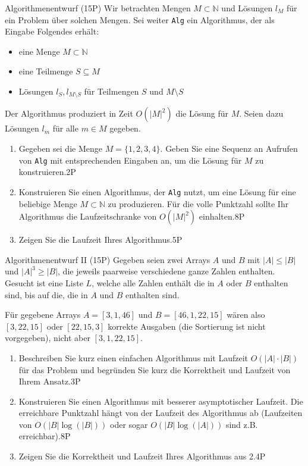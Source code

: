 \documentclass{article}
\begin{document}
\begin{exercise}{Algorithmenentwurf (15P)}
  Wir betrachten Mengen $M \subset \mathbb{N}$ und Lösungen $l_M$ für ein Problem über solchen Mengen. Sei weiter \texttt{Alg} ein Algorithmus, der als Eingabe Folgendes erhält:
  \begin{itemize}
    \item eine Menge $M \subset \mathbb{N}$
    \item eine Teilmenge $S \subseteq M$
    \item Lösungen $l_S, l_{M \setminus S}$ für Teilmengen $S$ und $M \setminus S$
  \end{itemize}
  Der Algorithmus produziert in Zeit $O(|M|^2)$ die Lösung für $M$. Seien dazu Lösungen $l_m$ für alle $m \in M$ gegeben.
  \begin{enumerate}
    \item Gegeben sei die Menge $M = \{1, 2, 3, 4\}$. Geben Sie eine Sequenz an Aufrufen von \texttt{Alg} mit entsprechenden Eingaben an, um die Lösung für $M$ zu konstruieren.\hfill 2P
    \item Konstruieren Sie einen Algorithmus, der \texttt{Alg} nutzt, um eine Lösung für eine beliebige Menge $M \subset \mathbb{N}$ zu produzieren. Für die volle Punktzahl sollte Ihr Algorithmus die Laufzeitschranke von $O(|M|^2)$ einhalten.\hfill 8P
    \item Zeigen Sie die Laufzeit Ihres Algorithmus.\hfill 5P
  \end{enumerate}
  \begin{solution}
  \end{solution}
\end{exercise}

\begin{exercise}{Algorithmenentwurf II (15P)}
  Gegeben seien zwei Arrays $A$ und $B$ mit $|A| \leq |B|$ und $|A|^3 \geq |B|$, die jeweils paarweise verschiedene ganze Zahlen enthalten. Gesucht ist eine Liste $L$, welche alle Zahlen enthält die in $A$ oder $B$ enthalten sind, bis auf die, die in $A$ und $B$ enthalten sind.\par
  Für gegebene Arrays $A = [3,1,46]$ und $B = [46,1,22,15]$ wären also $[3,22,15]$ oder $[22, 15, 3]$ korrekte Ausgaben (die Sortierung ist nicht vorgegeben), nicht aber $[3, 1, 22, 15]$.
  \begin{enumerate}
    \item Beschreiben Sie kurz einen einfachen Algorithmus mit Laufzeit $O(|A| \cdot |B|)$ für das Problem und begründen Sie kurz die Korrektheit und Laufzeit von Ihrem Ansatz.\hfill 3P
    \item Konstruieren Sie einen Algorithmus mit besserer asymptotischer Laufzeit. Die erreichbare Punktzahl hängt von der Laufzeit des Algorithmus ab (Laufzeiten von $O(|B| \log(|B|))$ oder sogar $O(|B| \log(|A|))$ sind z.B. erreichbar).\hfill 8P
    \item Zeigen Sie die Korrektheit und Laufzeit Ihres Algorithmus aus 2.\hfill 4P
  \end{enumerate}
  \begin{solution}
  \end{solution}
\end{exercise}
\end{document}
